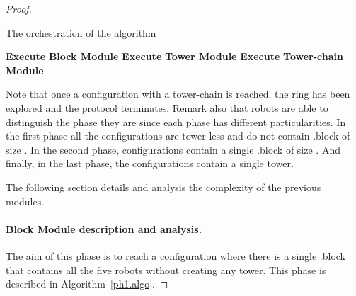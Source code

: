\documentclass[12pt]{llncs}
\begin{document}
\begin{proof}
{\footnotesize 
\begin{algorithm}[H]
  \caption{The orchestration of the algorithm}
  \label{protocol.algo}
 \begin{algorithmic}[1]
         \State \textbf{Execute} \textbf{Block Module}
      \Else
          \State \textbf{Execute} \textbf{Tower Module} 
       \Else
           \State \textbf{Execute} \textbf{Tower-chain Module} 
     \EndIf
    \EndIf
   \EndIf
  \end{algorithmic}
\end{algorithm}
}
Note that once a configuration with a tower-chain is reached, the ring has been explored and the protocol terminates. Remark also that robots are able to distinguish the phase they are since each phase has different particularities. In the first phase all the configurations are tower-less and do not contain .block of size . 
In the second phase, configurations contain a single .block of size . And finally, in the last phase, the configurations contain a single tower.  

The following section details and analysis the complexity of the previous modules.

\paragraph{Block Module description and analysis.}\label{sec:ph1}

The aim of this phase is to reach a configuration where there is a single .block that contains all the five robots without creating any tower. 
This phase is described in Algorithm~\ref{ph1.algo}.


\end{proof}
\end{document}
